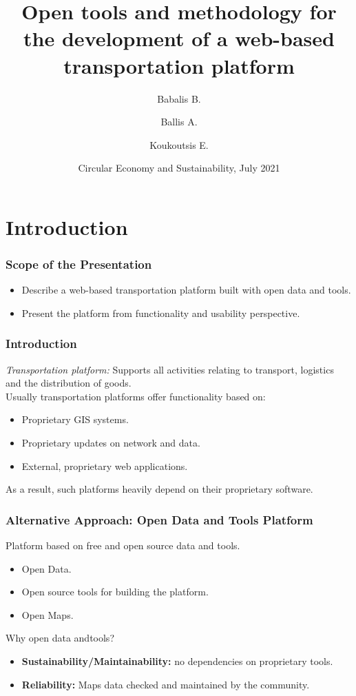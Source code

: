 \documentclass{beamer}
\title{Open tools and methodology for the development of a web-based transportation platform}
\author[Babalis B., Ballis A., Koukoutsis E.] %
{Babalis B.\inst{1} \and Ballis A.\inst{2} \and Koukoutsis E.\inst{1}}
\institute[National Technical University of Athens] %
{
  \inst{1}%
  School of Electrical and Computer Engineering\\
  National Technical University of Athens
  \and
  \inst{2}%
  School of Civil Engineering\\
  National Technical University of Athens
}
\date[CES 2021] %
{Circular Economy and Sustainability, July 2021}
\begin{document}
\frame{\titlepage}
%

\section{Introduction}

	\begin{frame}
	\frametitle{Scope of the Presentation}
	\begin{itemize}
    	\item Describe a web-based transportation platform built with open data and tools.
    	\item Present the platform from functionality and usability perspective.
    \end{itemize}
	
	\end{frame}

    \begin{frame}
    \frametitle{Introduction}
    \emph{Transportation platform:} Supports all activities relating to transport, logistics and the distribution of goods.\\
    Usually transportation platforms offer functionality based on:
    \begin{itemize}
    	\item Proprietary GIS systems.
    	\item Proprietary updates on network and data.
    	\item External, proprietary web applications.
    \end{itemize}
    \pause
    \checkmark As a result, such platforms heavily depend on their proprietary software.
    \end{frame}
    
    \begin{frame}
    \frametitle{Alternative Approach: Open Data and Tools Platform}
    Platform based on free and open source data and tools.
    
    \begin{itemize}
        \item Open Data.
        \item Open source tools for building the platform.
        \item Open Maps.
    \end{itemize}
    \pause
    \begin{block}{Why open data andtools?}
    \begin{itemize}
        \item \textbf{Sustainability/Maintainability:} no dependencies on proprietary tools.
        \item \textbf{Reliability:} Maps data checked and maintained by the community.
    \end{itemize}
    \end{block}
    
    \end{frame}
\end{document}
